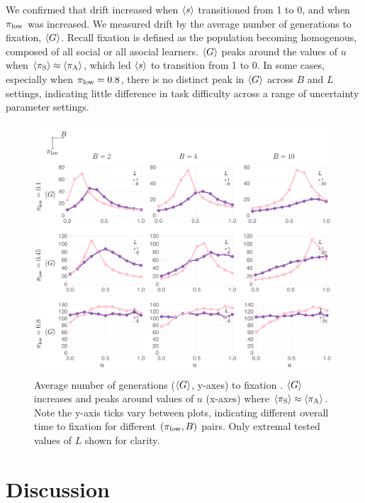\documentclass[letterpaper,11.5pt]{scrartcl}
\begin{document}
We confirmed that drift increased when $\langle s \rangle$ transitioned from 1 to 0, 
and when $\pi_{\mathrm{low}}$ was increased. We measured drift by the average number of 
generations to fixation, $\langle G \rangle$. Recall fixation is defined as the population
becoming homogenous, composed of all social or all asocial learners. 
$\langle G \rangle$ peaks around the values of $u$ 
when $\langle \pi_\mathrm{S} \rangle \approx \langle \pi_\mathrm{A} \rangle$, which led $\langle s \rangle$ to transition from 1 to 0.
In some cases, especially when $\pi_{\mathrm{low}}=0.8$,
there is no distinct peak in $\langle G \rangle$ across $B$ and $L$ settings, 
indicating little difference in task difficulty across a range of uncertainty parameter settings.


\begin{figure}
  \caption{Average number of generations ($\langle G \rangle$, y-axes) to fixation . 
    $\langle G \rangle$ increases and peaks around values of $u$ (x-axes) where
  $\langle \pi_\mathrm{S} \rangle \approx \langle \pi_\mathrm{A} \rangle$. Note the y-axis ticks vary between plots,
indicating different overall time to fixation for different $(\pi_{\mathrm{low}}, B)$
pairs. Only extremal tested values of $L$ shown for clarity.} 
  \label{fig:steps}
\centering
    \includegraphics[width=\textwidth]{Figures/stepResultsPlots.pdf}
\end{figure}



\section{Discussion}
\end{document}
